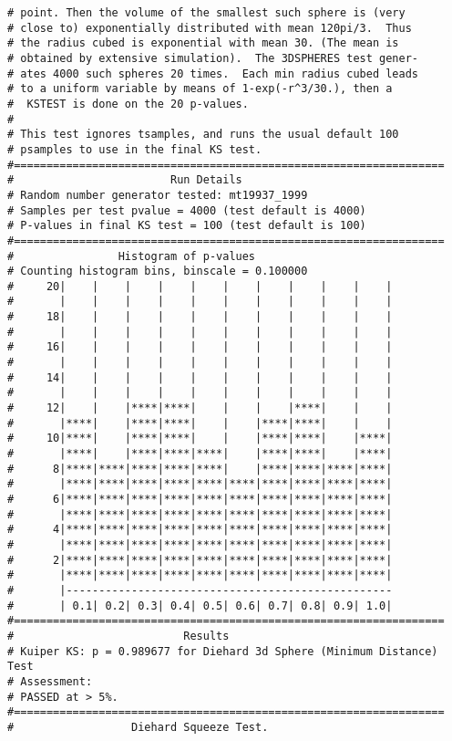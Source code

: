 \documentclass{book}
\begin{document}
\begin{verbatim}
# point. Then the volume of the smallest such sphere is (very   
# close to) exponentially distributed with mean 120pi/3.  Thus  
# the radius cubed is exponential with mean 30. (The mean is    
# obtained by extensive simulation).  The 3DSPHERES test gener- 
# ates 4000 such spheres 20 times.  Each min radius cubed leads 
# to a uniform variable by means of 1-exp(-r^3/30.), then a     
#  KSTEST is done on the 20 p-values.                           
#
# This test ignores tsamples, and runs the usual default 100
# psamples to use in the final KS test.
#==================================================================
#                        Run Details
# Random number generator tested: mt19937_1999
# Samples per test pvalue = 4000 (test default is 4000)
# P-values in final KS test = 100 (test default is 100)
#==================================================================
#                Histogram of p-values
# Counting histogram bins, binscale = 0.100000
#     20|    |    |    |    |    |    |    |    |    |    |
#       |    |    |    |    |    |    |    |    |    |    |
#     18|    |    |    |    |    |    |    |    |    |    |
#       |    |    |    |    |    |    |    |    |    |    |
#     16|    |    |    |    |    |    |    |    |    |    |
#       |    |    |    |    |    |    |    |    |    |    |
#     14|    |    |    |    |    |    |    |    |    |    |
#       |    |    |    |    |    |    |    |    |    |    |
#     12|    |    |****|****|    |    |    |****|    |    |
#       |****|    |****|****|    |    |****|****|    |    |
#     10|****|    |****|****|    |    |****|****|    |****|
#       |****|    |****|****|****|    |****|****|    |****|
#      8|****|****|****|****|****|    |****|****|****|****|
#       |****|****|****|****|****|****|****|****|****|****|
#      6|****|****|****|****|****|****|****|****|****|****|
#       |****|****|****|****|****|****|****|****|****|****|
#      4|****|****|****|****|****|****|****|****|****|****|
#       |****|****|****|****|****|****|****|****|****|****|
#      2|****|****|****|****|****|****|****|****|****|****|
#       |****|****|****|****|****|****|****|****|****|****|
#       |--------------------------------------------------
#       | 0.1| 0.2| 0.3| 0.4| 0.5| 0.6| 0.7| 0.8| 0.9| 1.0|
#==================================================================
#                          Results
# Kuiper KS: p = 0.989677 for Diehard 3d Sphere (Minimum Distance) Test
# Assessment:
# PASSED at > 5%.
#==================================================================
#                  Diehard Squeeze Test.

\end{verbatim}
\end{document}
